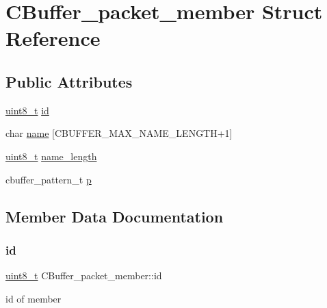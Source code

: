 \hypertarget{structCBuffer__packet__member}{}\section{C\+Buffer\+\_\+packet\+\_\+member Struct Reference}
\label{structCBuffer__packet__member}
\subsection*{Public Attributes}
\begin{DoxyCompactItemize}
\item 
\hyperlink{vl53l0x__types_8h_aba7bc1797add20fe3efdf37ced1182c5}{uint8\+\_\+t} \hyperlink{structCBuffer__packet__member_ac3dc1b0adc76a8e9f4b0731deb59e968}{id}
\item 
char \hyperlink{structCBuffer__packet__member_a2a612ad3c137e7fa5b089368e4e30eaa}{name} \mbox{[}C\+B\+U\+F\+F\+E\+R\+\_\+\+M\+A\+X\+\_\+\+N\+A\+M\+E\+\_\+\+L\+E\+N\+G\+TH+1\mbox{]}
\item 
\hyperlink{vl53l0x__types_8h_aba7bc1797add20fe3efdf37ced1182c5}{uint8\+\_\+t} \hyperlink{structCBuffer__packet__member_a8574aa9dd31388056a17af795c51ec6e}{name\+\_\+length}
\item 
cbuffer\+\_\+pattern\+\_\+t \hyperlink{structCBuffer__packet__member_aabf9f715818b2a5e4f1f5c6361e8b866}{p}
\end{DoxyCompactItemize}


\subsection{Member Data Documentation}
\mbox{\label{structCBuffer__packet__member_ac3dc1b0adc76a8e9f4b0731deb59e968}} 
\subsubsection{\texorpdfstring{id}{id}}
{\footnotesize\ttfamily \hyperlink{vl53l0x__types_8h_aba7bc1797add20fe3efdf37ced1182c5}{uint8\+\_\+t} C\+Buffer\+\_\+packet\+\_\+member\+::id}

id of member \mbox{\label{structCBuffer__packet__member_a2a612ad3c137e7fa5b089368e4e30eaa}} 
